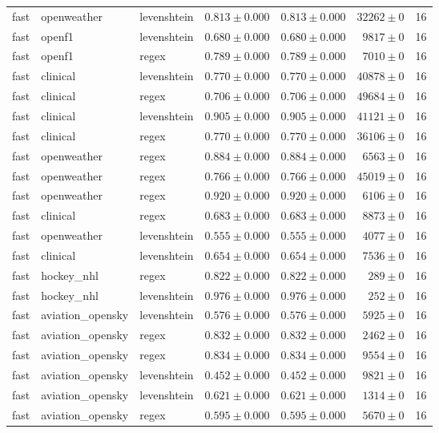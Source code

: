 \begin{table}[htbp]
\begin{tabular}{l l l r r r r}
fast & openweather & levenshtein & $0.813\pm0.000$ & $0.813\pm0.000$ & $32262\pm0$ & 16 \\
fast & openf1 & levenshtein & $0.680\pm0.000$ & $0.680\pm0.000$ & $9817\pm0$ & 16 \\
fast & openf1 & regex & $0.789\pm0.000$ & $0.789\pm0.000$ & $7010\pm0$ & 16 \\
fast & clinical & levenshtein & $0.770\pm0.000$ & $0.770\pm0.000$ & $40878\pm0$ & 16 \\
fast & clinical & regex & $0.706\pm0.000$ & $0.706\pm0.000$ & $49684\pm0$ & 16 \\
fast & clinical & levenshtein & $0.905\pm0.000$ & $0.905\pm0.000$ & $41121\pm0$ & 16 \\
fast & clinical & regex & $0.770\pm0.000$ & $0.770\pm0.000$ & $36106\pm0$ & 16 \\
fast & openweather & regex & $0.884\pm0.000$ & $0.884\pm0.000$ & $6563\pm0$ & 16 \\
fast & openweather & regex & $0.766\pm0.000$ & $0.766\pm0.000$ & $45019\pm0$ & 16 \\
fast & openweather & regex & $0.920\pm0.000$ & $0.920\pm0.000$ & $6106\pm0$ & 16 \\
fast & clinical & regex & $0.683\pm0.000$ & $0.683\pm0.000$ & $8873\pm0$ & 16 \\
fast & openweather & levenshtein & $0.555\pm0.000$ & $0.555\pm0.000$ & $4077\pm0$ & 16 \\
fast & clinical & levenshtein & $0.654\pm0.000$ & $0.654\pm0.000$ & $7536\pm0$ & 16 \\
fast & hockey\_nhl & regex & $0.822\pm0.000$ & $0.822\pm0.000$ & $289\pm0$ & 16 \\
fast & hockey\_nhl & levenshtein & $0.976\pm0.000$ & $0.976\pm0.000$ & $252\pm0$ & 16 \\
fast & aviation\_opensky & levenshtein & $0.576\pm0.000$ & $0.576\pm0.000$ & $5925\pm0$ & 16 \\
fast & aviation\_opensky & regex & $0.832\pm0.000$ & $0.832\pm0.000$ & $2462\pm0$ & 16 \\
fast & aviation\_opensky & regex & $0.834\pm0.000$ & $0.834\pm0.000$ & $9554\pm0$ & 16 \\
fast & aviation\_opensky & levenshtein & $0.452\pm0.000$ & $0.452\pm0.000$ & $9821\pm0$ & 16 \\
fast & aviation\_opensky & levenshtein & $0.621\pm0.000$ & $0.621\pm0.000$ & $1314\pm0$ & 16 \\
fast & aviation\_opensky & regex & $0.595\pm0.000$ & $0.595\pm0.000$ & $5670\pm0$ & 16 \\

\end{tabular}
\end{table}
